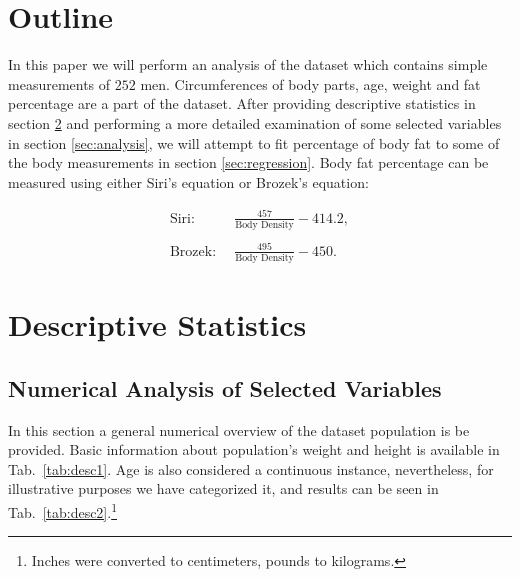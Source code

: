 \documentclass[11pt,american,american]{article}
\begin{document}
\begin{titlepage}
	
%	
	
	\vfill %
	
\end{titlepage}


\section{Outline}\label{sec:outline}

In this paper we will perform an analysis of the dataset which contains simple measurements of $252$ men. Circumferences of body parts, age, weight and fat percentage are a part of the dataset. After providing descriptive statistics in section \ref{sec:desc} and performing a more detailed examination of some selected variables in section \ref{sec:analysis}, we will attempt to fit percentage of body fat to some of the body measurements in section \ref{sec:regression}. Body fat percentage can be measured using either Siri's equation or Brozek's equation:

\begin{equation*}
	\begin{split}
		\text{Siri: } \, &\frac{457}{\text{Body Density}} - 414.2,	\\ \\
		\text{Brozek: } \, &\frac{495}{\text{Body Density}} - 450.
	\end{split}
\end{equation*}

\section{Descriptive Statistics}\label{sec:desc}

\subsection{Numerical Analysis of Selected Variables}

In this section a general numerical overview of the dataset population is be provided. Basic information about population's weight and height is available in Tab.~\ref{tab:desc1}. Age is also considered a continuous instance, nevertheless, for illustrative purposes we have categorized it, and results can be seen in Tab.~\ref{tab:desc2}.\footnote{Inches were converted to centimeters, pounds to kilograms.} 
\end{document}
